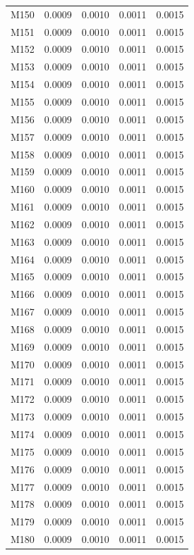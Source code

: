 \begin{longtable}{lrrrr}
M150 & 0.0009 & 0.0010 & 0.0011 & 0.0015 \\
M151 & 0.0009 & 0.0010 & 0.0011 & 0.0015 \\
M152 & 0.0009 & 0.0010 & 0.0011 & 0.0015 \\
M153 & 0.0009 & 0.0010 & 0.0011 & 0.0015 \\
M154 & 0.0009 & 0.0010 & 0.0011 & 0.0015 \\
M155 & 0.0009 & 0.0010 & 0.0011 & 0.0015 \\
M156 & 0.0009 & 0.0010 & 0.0011 & 0.0015 \\
M157 & 0.0009 & 0.0010 & 0.0011 & 0.0015 \\
M158 & 0.0009 & 0.0010 & 0.0011 & 0.0015 \\
M159 & 0.0009 & 0.0010 & 0.0011 & 0.0015 \\
M160 & 0.0009 & 0.0010 & 0.0011 & 0.0015 \\
M161 & 0.0009 & 0.0010 & 0.0011 & 0.0015 \\
M162 & 0.0009 & 0.0010 & 0.0011 & 0.0015 \\
M163 & 0.0009 & 0.0010 & 0.0011 & 0.0015 \\
M164 & 0.0009 & 0.0010 & 0.0011 & 0.0015 \\
M165 & 0.0009 & 0.0010 & 0.0011 & 0.0015 \\
M166 & 0.0009 & 0.0010 & 0.0011 & 0.0015 \\
M167 & 0.0009 & 0.0010 & 0.0011 & 0.0015 \\
M168 & 0.0009 & 0.0010 & 0.0011 & 0.0015 \\
M169 & 0.0009 & 0.0010 & 0.0011 & 0.0015 \\
M170 & 0.0009 & 0.0010 & 0.0011 & 0.0015 \\
M171 & 0.0009 & 0.0010 & 0.0011 & 0.0015 \\
M172 & 0.0009 & 0.0010 & 0.0011 & 0.0015 \\
M173 & 0.0009 & 0.0010 & 0.0011 & 0.0015 \\
M174 & 0.0009 & 0.0010 & 0.0011 & 0.0015 \\
M175 & 0.0009 & 0.0010 & 0.0011 & 0.0015 \\
M176 & 0.0009 & 0.0010 & 0.0011 & 0.0015 \\
M177 & 0.0009 & 0.0010 & 0.0011 & 0.0015 \\
M178 & 0.0009 & 0.0010 & 0.0011 & 0.0015 \\
M179 & 0.0009 & 0.0010 & 0.0011 & 0.0015 \\
M180 & 0.0009 & 0.0010 & 0.0011 & 0.0015 \\

\end{longtable}
